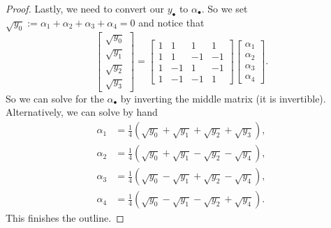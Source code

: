 \begin{proof}
	Lastly, we need to convert our $y_\bullet$ to $\alpha_\bullet.$ So we set $\sqrt{y_0}:=\alpha_1+\alpha_2+\alpha_3+\alpha_4=0$ and notice that
	\[\begin{bmatrix}
		\sqrt{y_0} \\
		\sqrt{y_1} \\
		\sqrt{y_2} \\
		\sqrt{y_3}
	\end{bmatrix}=\begin{bmatrix}
		1 & 1 & 1 & 1 \\
		1 & 1 & -1 & -1 \\
		1 & -1 & 1 & -1 \\
		1 & -1 & -1 & 1
	\end{bmatrix}
	\begin{bmatrix}
		\alpha_1 \\
		\alpha_2 \\
		\alpha_3 \\
		\alpha_4
	\end{bmatrix}.\]
	So we can solve for the $\alpha_\bullet$ by inverting the middle matrix (it is invertible). Alternatively, we can solve by hand
	\begin{align*}
		\alpha_1 &= {\textstyle\frac14}\left(\sqrt{y_0}+\sqrt{y_1}+\sqrt{y_2}+\sqrt{y_3}\right), \\
		\alpha_2 &= {\textstyle\frac14}\left(\sqrt{y_0}+\sqrt{y_1}-\sqrt{y_2}-\sqrt{y_4}\right), \\
		\alpha_3 &= {\textstyle\frac14}\left(\sqrt{y_0}-\sqrt{y_1}+\sqrt{y_2}-\sqrt{y_4}\right), \\
		\alpha_4 &= {\textstyle\frac14}\left(\sqrt{y_0}-\sqrt{y_1}-\sqrt{y_2}+\sqrt{y_4}\right).
	\end{align*}
	This finishes the outline.
\end{proof}


